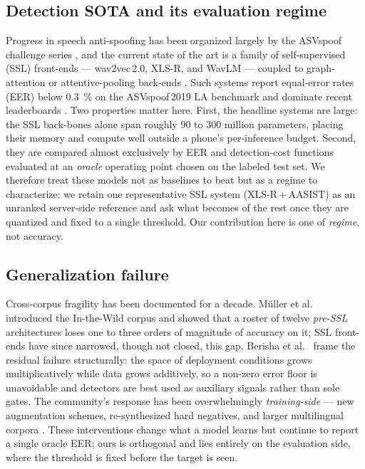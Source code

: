 \documentclass[journal]{IEEEtran}
\newcommand{\todo}[1]{\textcolor{red}{[\textbf{TODO:} #1]}}
\begin{document}
\subsection{Detection SOTA and its evaluation regime}
Progress in speech anti-spoofing has been organized largely by the ASVspoof
challenge series \cite{yamagishi21_asvspoof2021,wang24_asvspoof5}, and the
current state of the art is a family of self-supervised (SSL) front-ends ---
wav2vec\,2.0, XLS-R, and WavLM \cite{babu22_xlsr,chen22_wavlm} --- coupled to
graph-attention or attentive-pooling back-ends
\cite{jung22_aasist,tak22_xlsr_aasist}. Such systems report equal-error rates
(EER) below \SI{0.3}{\percent} on the ASVspoof\,2019 LA benchmark and dominate
recent leaderboards \cite{li25_survey}. Two properties matter here. First, the
headline systems are large: the SSL back-bones alone span roughly 90 to 300
million parameters, placing their memory and compute well outside a phone's
per-inference budget. Second, they are compared almost exclusively by EER and
detection-cost functions evaluated at an \emph{oracle} operating point chosen on
the labeled test set. We therefore treat these models not as baselines to beat
but as a regime to characterize: we retain one representative SSL system
(XLS-R\,+\,AASIST) as an unranked server-side reference and ask what becomes of
the rest once they are quantized and fixed to a single threshold. Our
contribution here is one of \emph{regime}, not accuracy.

\subsection{Generalization failure}
Cross-corpus fragility has been documented for a decade. M\"{u}ller et
al.\ \cite{muller22_in_the_wild} introduced the In-the-Wild corpus and showed
that a roster of twelve \emph{pre-SSL} architectures loses one to three orders
of magnitude of accuracy on it; SSL front-ends have since narrowed, though not
closed, this gap. Berisha et al.\ \cite{berisha25_coverage_debt} frame the
residual failure structurally: the space of deployment conditions grows
multiplicatively while data grows additively, so a non-zero error floor is
unavoidable and detectors are best used as auxiliary signals rather than sole
gates. The community's response has been overwhelmingly \emph{training-side} ---
new augmentation schemes, re-synthesized hard negatives, and larger multilingual
corpora \cite{mlaad24}.%
These interventions change what a model learns but continue to report a single
oracle EER; ours is orthogonal and lies entirely on the evaluation side, where
the threshold is fixed before the target is seen.
\end{document}
